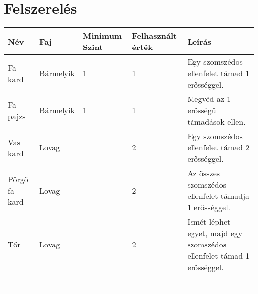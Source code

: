 \section{Felszerelés}
\begin{center}
		\begin{tabular}{lllll}
			Név           & Faj     & Minimum Szint & Felhasznált érték & Leírás                                                                 \\ \hline
			Fa kard       & Bármelyik & 1             & 1                 & Egy szomszédos ellenfelet támad 1 erősséggel.                          \\
			Fa pajzs      & Bármelyik & 1             & 1                 & Megvéd az 1 erősségű támadások ellen.                                  \\
			Vas kard      & Lovag     &               & 2                 & Egy szomszédos ellenfelet támad 2 erősséggel.                          \\
			Pörgő fa kard & Lovag     &               & 2                 & Az összes szomszédos ellenfelet támadja 1 erősséggel.                  \\
			Tőr           & Lovag     &               & 2                 & Ismét léphet egyet, majd egy szomszédos ellenfelet támad 1 erősséggel. \\
			&           &               &                   &                                                                        \\
			&           &               &                   &                                                                        \\
			&           &               &                   &                                                                        \\
			&           &               &                   &                                                                        \\
			&           &               &                   &                                                                       
		\end{tabular}%
\end{center}